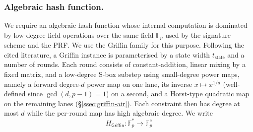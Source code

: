 \subsubsection{Algebraic hash function.}
We require an algebraic hash function whose internal computation is dominated by low-degree field operations over the same field $\mathbb{F}_p$ used by the signature scheme and the PRF. We use the Griffin family for this purpose. Following the cited literature, a Griffin instance is parameterised by a state width $t_{\mathsf{state}}$ and a number of rounds. Each round consists of constant-addition, linear mixing by a fixed matrix, and a low-degree S-box substep using small-degree power maps, namely a forward degree-$d$ power map on one lane, its inverse $x\mapsto x^{1/d}$ (well-defined since $\gcd(d,p-1)=1$) on a second, and a Horst-type quadratic map on the remaining lanes (\S\ref{ssec:griffin-air}). Each constraint then has degree at most $d$ while the per-round map has high algebraic degree. We write
\begin{equation*}
  H_{\mathsf{Griffin}}:\mathbb{F}_p^{\ast}\to\mathbb{F}_p^{c}
\end{equation*}
